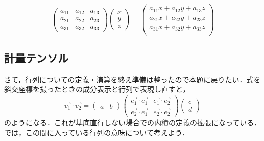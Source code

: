 \documentclass[dvipdfmx,a4]{jsarticle}
\begin{document}
\begin{equation*}
  \begin{pmatrix}
    a_{11} & a_{12} & a_{13} \\
    a_{21} & a_{22} & a_{23} \\
    a_{31} & a_{32} & a_{33} 
    \end{pmatrix}
    \begin{pmatrix}
      x\\
      y\\
      z
    \end{pmatrix}
    =
    \begin{pmatrix}
      a_{11}x + a_{12} y +a_{13}z\\
      a_{21}x + a_{22} y +a_{23}z\\
      a_{31}x + a_{32} y +a_{33}z\\
     \end{pmatrix}
\end{equation*}

\subsection{計量テンソル}
さて，行列についての定義・演算を終え準備は整ったので本題に戻りたい．式を斜交座標を撮ったときの成分表示と行列で表現し直すと，
\begin{equation*}
  \vec{v_1}\cdot \vec{v_2}= 
  \begin{pmatrix}
    a & b
  \end{pmatrix}
  \begin{pmatrix}
    \vec{e_1} \cdot \vec{e_1} & \vec{e_1} \cdot \vec{e_2}\\
    \vec{e_2} \cdot \vec{e_1} & \vec{e_2} \cdot \vec{e_2}
  \end{pmatrix}
  \begin{pmatrix}
    c\\ 
    d
  \end{pmatrix}
\end{equation*}
のようになる．これが基底直行しない場合での内積の定義の拡張になっている．では，この間に入っている行列の意味について考えよう．
\end{document}
